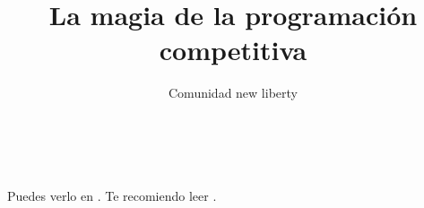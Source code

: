 \documentclass[11pt,a4paper]{book}
\author{Comunidad new liberty}
\title{La magia de la programación competitiva}
\begin{document}


\maketitle
\tableofcontents
\cleardoublepage
{}
\listoffigures
\cleardoublepage
{}
\listoftables
\cleardoublepage






\\
\\
Puedes verlo en \cite{Patricio2011}. Te recomiendo leer \cite{Patricio2011, Zacarias2009, Alfonso2010b, Alfonso2010a}.
\cleardoublepage
{}

\end{document}
